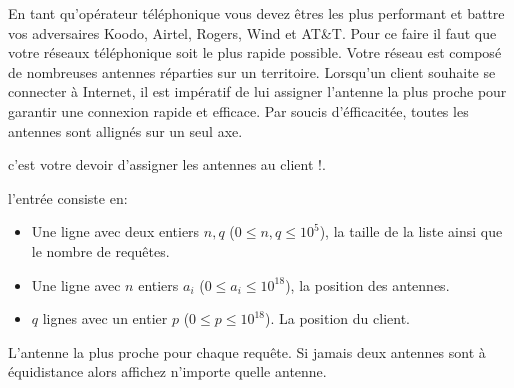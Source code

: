 

\newcommand{\maxa}{123456789}

En tant qu'opérateur téléphonique vous devez êtres les plus performant et battre vos adversaires Koodo, Airtel, Rogers, Wind et AT\&T. Pour ce faire il faut que votre réseaux téléphonique soit le plus rapide possible. Votre réseau est composé de nombreuses antennes réparties sur un territoire. Lorsqu’un client souhaite se connecter à Internet, il est impératif de lui assigner l’antenne la plus proche pour garantir une connexion rapide et efficace. Par soucis d'éfficacitée, toutes les antennes sont allignés sur un seul axe.

c'est votre devoir d'assigner les antennes au client !.

\begin{Input}
    l'entrée consiste en:
    \begin{itemize}
        \item Une ligne avec deux entiers $n, q$ ($0\leq n, q\leq 10^5$), la taille de la liste ainsi que le nombre de requêtes.
        \item Une ligne avec $n$ entiers $a_i$ ($0  \leq a_i \leq 10^{18}$), la position des antennes.
        \item $q$ lignes avec un entier $p$ ($0 \leq p \leq 10^{18}$). La position du client.
    \end{itemize}
\end{Input}

\begin{Output}
    L'antenne la plus proche pour chaque requête. Si jamais deux antennes sont à équidistance alors affichez n'importe quelle antenne.
\end{Output}
